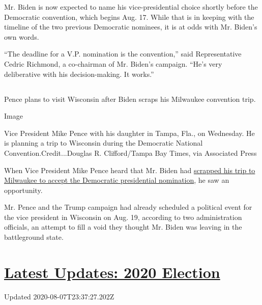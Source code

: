 Mr. Biden is now expected to name his vice-presidential choice shortly
before the Democratic convention, which begins Aug. 17. While that is in
keeping with the timeline of the two previous Democratic nominees, it is
at odds with Mr. Biden's own words.

``The deadline for a V.P. nomination is the convention,'' said
Representative Cedric Richmond, a co-chairman of Mr. Biden's campaign.
``He's very deliberative with his decision-making. It works.''

\hypertarget{section-3}{%
\subsection{}\label{section-3}}

Pence plans to visit Wisconsin after Biden scraps his Milwaukee
convention trip.

Image

Vice President Mike Pence with his daughter in Tampa, Fla., on
Wednesday. He is planning a trip to Wisconsin during the Democratic
National Convention.Credit...Douglas R. Clifford/Tampa Bay Times, via
Associated Press

When Vice President Mike Pence heard that Mr. Biden had
\href{https://www.nytimes3xbfgragh.onion/2020/08/05/us/politics/joe-biden-milwaukee.html}{scrapped
his trip to Milwaukee to accept the Democratic presidential nomination},
he saw an opportunity.

Mr. Pence and the Trump campaign had already scheduled a political event
for the vice president in Wisconsin on Aug. 19, according to two
administration officials, an attempt to fill a void they thought Mr.
Biden was leaving in the battleground state.

\hypertarget{latest-updates-2020-election}{%
\section{\texorpdfstring{\href{https://www.nytimes3xbfgragh.onion/2020/08/07/us/elections/trump-biden.html?action=click\&pgtype=Article\&state=default\&region=MAIN_CONTENT_1\&context=storylines_live_updates}{Latest
Updates: 2020
Election}}{Latest Updates: 2020 Election}}\label{latest-updates-2020-election}}

Updated 2020-08-07T23:37:27.202Z

